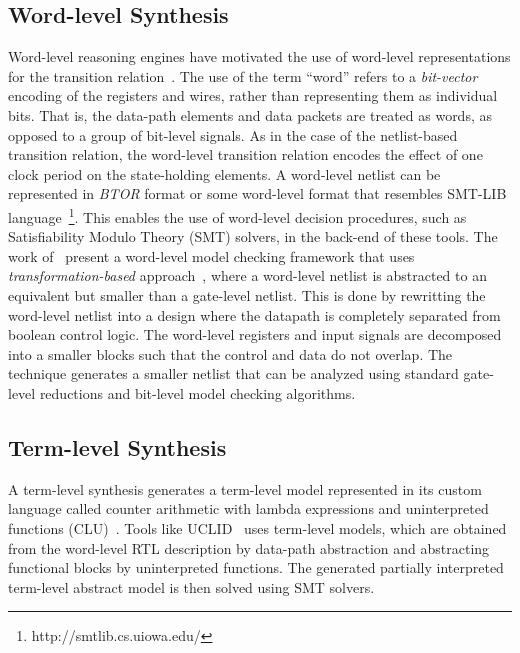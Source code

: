 \subsection{Word-level Synthesis}
Word-level reasoning engines have motivated the use of word-level
representations for the transition
relation~\cite{DBLP:conf/mtv/SunkariCVM07,soc-keating}. The use of the term
``word'' refers to a \textit{bit-vector} encoding of the registers and 
wires, rather than representing them as individual bits. That is, the data-path 
elements and data packets are treated as words, as opposed to a group of 
bit-level signals.  
As in the case of the netlist-based transition relation, the word-level 
transition relation encodes the effect of one clock period on the 
state-holding elements. A word-level netlist can be represented 
in \emph{BTOR} format or some word-level format that resembles SMT-LIB 
language~\footnote{http://smtlib.cs.uiowa.edu/}.  
This enables the use of word-level decision procedures, such as 
Satisfiability Modulo Theory (SMT) solvers, in the back-end of these tools.  
The work of~\cite{DBLP:conf/cav/Bjesse08} 
present a word-level model checking framework that uses 
\emph{transformation-based} approach~\cite{DBLP:conf/fmcad/GloklerBSSHRMR06}, 
where a word-level netlist is abstracted to an equivalent but smaller than a gate-level 
netlist.  This is done by rewritting the word-level netlist into a 
design where the datapath is completely separated from boolean control 
logic. The word-level registers and input signals are decomposed into a 
smaller blocks such that the control and data do not overlap. The technique 
generates a smaller netlist that can be analyzed using standard gate-level 
reductions and bit-level model checking algorithms. 


\subsection{Term-level Synthesis}
A term-level synthesis generates a term-level model represented 
in its custom language called counter arithmetic with lambda 
expressions and uninterpreted functions (CLU)~\cite{uclid}.  Tools 
like UCLID~\cite{uclid} uses term-level models, which are obtained 
from the word-level RTL description by data-path abstraction and 
abstracting functional blocks by uninterpreted functions.  The 
generated partially interpreted term-level abstract model is then 
solved using SMT solvers.  

